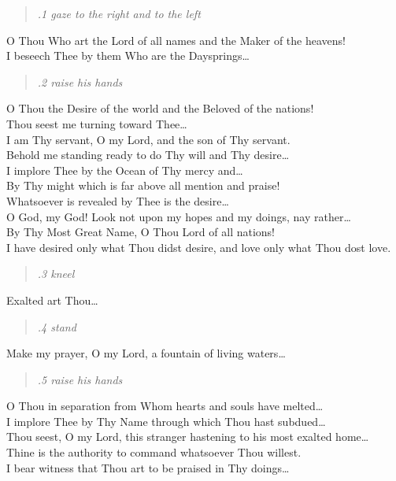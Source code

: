 \documentclass[14pt]{extarticle}
\begin{document}
\begin{hafez}{}{}
  \begin{quote}
    \emph{.1 gaze to the right and to the left}
  \end{quote}

  O Thou Who art the Lord of all names and the Maker of the heavens! \\
  I beseech Thee by them Who are the Daysprings\dots{}

  \begin{quote}
    \emph{.2 raise his hands}
  \end{quote}

  O Thou the Desire of the world and the Beloved of the nations! \\
  Thou seest me turning toward Thee\dots{} \\
  I am Thy servant, O my Lord, and the son of Thy servant. \\
  Behold me standing ready to do Thy will and Thy desire\dots{} \\
  I implore Thee by the Ocean of Thy mercy and\dots{} \\
  By Thy might which is far above all mention and praise! \\
  Whatsoever is revealed by Thee is the desire\dots{} \\
  O God, my God! Look not upon my hopes and my doings, nay rather\dots{} \\
  By Thy Most Great Name, O Thou Lord of all nations! \\
  I have desired only what Thou didst desire, and love only what Thou dost love.

  \begin{quote}
    \emph{.3 kneel}
  \end{quote}

  Exalted art Thou\dots{}

  \begin{quote}
    \emph{.4 stand}
  \end{quote}

  Make my prayer, O my Lord, a fountain of living waters\dots{}

  \begin{quote}
    \emph{.5 raise his hands}
  \end{quote}

  O Thou in separation from Whom hearts and souls have melted\dots{} \\
  I implore Thee by Thy Name through which Thou hast subdued\dots{} \\
  Thou seest, O my Lord, this stranger hastening to his most exalted home\dots{} \\
  Thine is the authority to command whatsoever Thou willest. \\
  I bear witness that Thou art to be praised in Thy doings\dots{}


\end{hafez}
\end{document}

